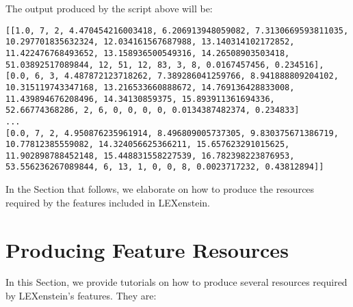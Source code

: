 The output produced by the script above will be:

\begin{lstlisting}
[[1.0, 7, 2, 4.470454216003418, 6.206913948059082, 7.3130669593811035, 10.297701835632324, 12.034161567687988, 13.140314102172852, 11.422476768493652, 13.158936500549316, 14.26508903503418, 51.03892517089844, 12, 51, 12, 83, 3, 8, 0.0167457456, 0.234516], [0.0, 6, 3, 4.487872123718262, 7.389286041259766, 8.941888809204102, 10.315119743347168, 13.216533660888672, 14.769136428833008, 11.439894676208496, 14.34130859375, 15.893911361694336, 52.66774368286, 2, 6, 0, 0, 0, 0, 0.0134387482374, 0.234833]
...
[0.0, 7, 2, 4.950876235961914, 8.496809005737305, 9.830375671386719, 10.77812385559082, 14.324056625366211, 15.657623291015625, 11.902898788452148, 15.448831558227539, 16.782398223876953, 53.556236267089844, 6, 13, 1, 0, 0, 8, 0.0023717232, 0.43812894]]
\end{lstlisting}

In the Section that follows, we elaborate on how to produce the resources required by the features included in LEXenstein.



\section{Producing Feature Resources}

In this Section, we provide tutorials on how to produce several resources required by LEXenstein's features. They are:

